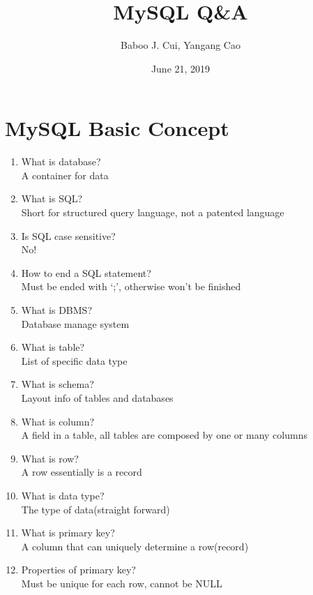 \documentclass[10pt,a4paper,oneside]{article}
\date{June 21, 2019}
\author{Baboo J. Cui, Yangang Cao}
\title{MySQL Q\&A}
\begin{document}
\maketitle
\tableofcontents

\newpage

\section{MySQL Basic Concept}
\begin{enumerate}[1.]
\item What is database? \\
A container for data
\item What is SQL? \\
Short for structured query language, not a patented language
\item Is SQL case sensitive? \\
No!
\item  How to end a SQL statement?\\
Must be ended with `;', otherwise won’t be finished
\item What is DBMS? \\
Database manage system
\item What is table? \\
List of specific data type
\item What is schema? \\
Layout info of tables and databases
\item What is column? \\
A field in a table, all tables are composed by one or many columns
\item What is row? \\
A row essentially is a record
\item What is data type? \\
The type of data(straight forward)
\item  What is primary key?\\
A column that can uniquely determine a row(record)
\item Properties of primary key?\\
Must be unique for each row, cannot be NULL
\end{enumerate}
\end{document}
